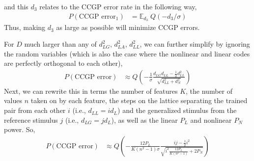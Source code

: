 \documentclass[letter,12pt]{article}
\newcommand{\dll}{d_{LL}}
\newcommand{\dlg}{d_{LG}}
\newcommand{\dla}{d_{LA}}
\newcommand{\dn}{d_{N}}
\newcommand{\dis}{\mathcal{N}(0, 1/D)}
\begin{document}
and this $d_{3}$ relates to the CCGP error rate in the following way,
\begin{align}
  P(\textrm{CCGP error}_{1}) &= \mathbb{E}_{d_{3}} \; Q\left(-d_{3}/\sigma\right)
\end{align}
Thus, making $d_{3}$ as large as possible will minimize CCGP errors. 

For $D$ much larger than any of $\dlg^{2}$, $\dla^{2}$, $\dll^{2}$, we can
further simplify by ignoring the random variables
(which is also the case where the nonlinear and linear codes are perfectly
orthogonal to each other),
\begin{align}
  P(\textrm{CCGP error}) &\approx Q\left(-\frac{1}{\sigma}
  \frac{\dlg\dll - \frac{1}{2}\dll^{2}}
  {\sqrt{\dll^{2} + \dn^{2}}}\right)
\end{align}
Next, we can rewrite this in terms the number of features $K$, the number of
values $n$ taken on by each feature, the steps on the lattice separating
the trained pair from each other $i$ (i.e., $\dll = i d_{L}$) and the
generalized stimulus from the
reference stimulus $j$ (i.e., $\dlg = j d_{L}$), as well as the linear $P_{L}$
and nonlinear $P_{N}$ power. So,
\begin{align}
  P(\textrm{CCGP error}) &\approx Q\left(-\frac{12 P_{L}}{K (n^{2} - 1)\sigma}
  \frac{ij - \frac{1}{2}i^{2}}
  {\sqrt{i^{2}\frac{12 P_{L}}{K(n^{2} - 1)} + 2 P_{N}}}\right)  
\end{align}

\end{document}
